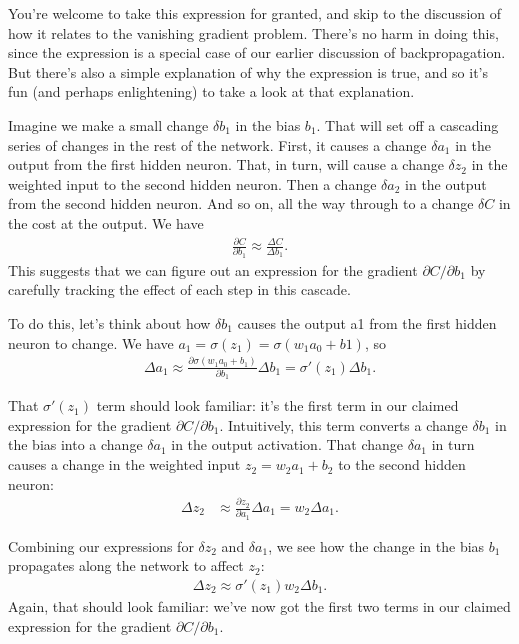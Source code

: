 \documentclass[a4paper,twoside,10pt]{book}
\begin{document}
You're welcome to take this expression for granted, and skip to the discussion of how it relates to the vanishing gradient problem. There's no harm in doing this, since the expression is a special case of our earlier discussion of backpropagation. But there's also a simple explanation of why the expression is true, and so it's fun (and perhaps enlightening) to take a look at that explanation.

Imagine we make a small change $\delta b_1$ in the bias $b_1$. That will set off a cascading series of changes in the rest of the network. First, it causes a change $\delta a_1$ in the output from the first hidden neuron. That, in turn, will cause a change $\delta z_2$ in the weighted input to the second hidden neuron. Then a change $\delta a_2$ in the output from the second hidden neuron. And so on, all the way through to a change $\delta C$ in the cost at the output. We have
\begin{eqnarray}
\frac{\partial C}{\partial b_1} \approx \frac{\Delta C}{\Delta b_1}.\label{eq:114}
\end{eqnarray}
This suggests that we can figure out an expression for the gradient $\partial C/\partial b_1$ by carefully tracking the effect of each step in this cascade.





To do this, let's think about how $\delta b_1$ causes the output a1 from the first hidden neuron to change. We have $a_1=\sigma(z_1)=\sigma(w_1a_0+b1)$, so
\begin{eqnarray}
\Delta a_1 \approx \frac{\partial \sigma(w_1 a_0+b_1)}{\partial b_1} \Delta b_1 = \sigma'(z_1) \Delta b_1. \label{eq:116}
\end{eqnarray}

That $\sigma'(z_1)$ term should look familiar: it's the first term in our claimed expression for the gradient $\partial C/\partial b_1$. Intuitively, this term converts a change $\delta b_1$ in the bias into a change $\delta a_1$ in the output activation. That change $\delta a_1$ in turn causes a change in the weighted input $z_2=w_2a_1+b_2$ to the second hidden neuron:
\begin{eqnarray}
\Delta z_2 & \approx \frac{\partial z_2}{\partial a_1} \Delta a_1 =  w_2 \Delta a_1. \label{eq:118}
\end{eqnarray}

Combining our expressions for $\delta z_2$ and $\delta a_1$, we see how the change in the bias $b_1$ propagates along the network to affect $z_2$:
\begin{eqnarray}
\Delta z_2 \approx \sigma'(z_1) w_2 \Delta b_1.\label{eq:119}
\end{eqnarray}
Again, that should look familiar: we've now got the first two terms in our claimed expression for the gradient $\partial C/\partial b_1$.
\end{document}
